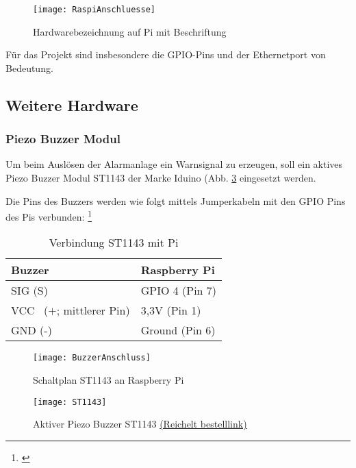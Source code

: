 \documentclass[a4paper,12pt]{article}
\begin{document}
	\begin{figure}[H]
		\centering
		\texttt{[image: RaspiAnschluesse]}
		\caption{Hardwarebezeichnung auf Pi mit Beschriftung}
		\label{RaspiAnschluesse}
	\end{figure}
	
Für das Projekt sind insbesondere die GPIO-Pins und der Ethernetport von Bedeutung.\par

\newpage

\subsection{Weitere Hardware}
\subsubsection{Piezo Buzzer Modul}
	Um beim Auslösen der Alarmanlage ein Warnsignal zu erzeugen, soll ein aktives Piezo Buzzer Modul ST1143 der Marke Iduino (Abb. \ref{ST1143} eingesetzt werden.\par Die Pins des Buzzers werden wie folgt mittels Jumperkabeln mit den GPIO Pins des Pis verbunden: \footnote{\cite{Draeger.2019}}
	
	\begin{table}[H]
		\centering
		\begin{tabular}{|p{5cm}|p{5cm}|} 
			\hline
			Buzzer & Raspberry Pi\\ 
			\hline
			SIG (S)   & GPIO 4 \hspace{0,1cm}(Pin 7)\\  
			\hline
			VCC~ ($+$; mittlerer Pin)   & 3,3V 	\hspace{0,7cm}(Pin 1)\\
			\hline
			GND (-)    & Ground  	\hspace{0,2cm}(Pin 6)\\
			\hline
		\end{tabular}
	\caption{Verbindung ST1143 mit Pi}
	\end{table} 

	
	\begin{figure}[H]
	\centering
	\texttt{[image: BuzzerAnschluss]}
	\caption{Schaltplan ST1143 an Raspberry Pi}
	\label{BuzzerAnschluss}
	\end{figure}

	\begin{figure}[H]	%
	\centering
	\texttt{[image: ST1143]}
	\caption{Aktiver Piezo Buzzer ST1143 \href{https://www.reichelt.de/sg/de/entwicklerboards-summer-aktiv-debo-buzzer-a2-p282660.html}{(Reichelt bestelllink)}}
	\label{ST1143}
	\end{figure}
\end{document}
